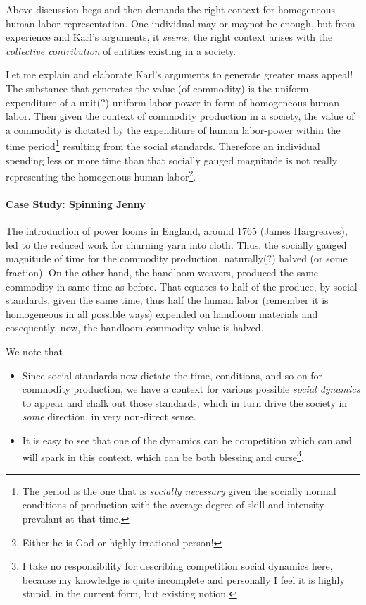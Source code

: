 \documentclass[12pt]{extarticle}
\theoremstyle{definition}
\newenvironment{remark}[1][Remark]{\begin{trivlist}
\item[\hskip \labelsep {\bfseries #1}]}{\end{trivlist}}
\begin{document}
        Above discussion begs and then demands the right context for homogeneous human labor representation.  One individual may or maynot be enough, but from experience and Karl's arguments, it \emph{seems}, the right context arises with the \emph{collective contribution} of entities existing in a society.

        Let me explain and elaborate Karl's arguments to generate greater mass appeal!  The substance that generates the value (of commodity) is the uniform expenditure of a unit(?) uniform labor-power in form of homogeneous human labor.  Then given the context of commodity production in a society, the value of a commodity is dictated by the expenditure of human labor-power within the time period\footnote{The period is the one that is \emph{socially necessary} given the socially normal conditions of production with the average degree of skill and intensity prevalant at that time.} resulting from the social standards.  Therefore an individual spending less or more time than that socially gauged magnitude is not really representing the homogenous human labor\footnote{Either he is God or highly irrational person!}.

        \paragraph{Case Study: Spinning Jenny}
        The introduction of power looms in England, around 1765 (\href{https://en.wikipedia.org/wiki/James_Hargreaves}{James Hargreaves}), led to the reduced work for churning yarn into cloth.  Thus, the socially gauged magnitude of time for the commodity production, naturally(?) halved (or some fraction).  On the other hand, the handloom weavers, produced the same commodity in same time as before.  That equates to half of the produce, by social standards, given the same time, thus half the human labor (remember it is homogeneous in all possible ways) expended on handloom materials and cosequently, now, the handloom commodity value is halved.

        \begin{remark}
          We note that
          \begin{itemize}
          \item Since social standards now dictate the time, conditions, and so on for commodity production, we have a context for various possible \emph{social dynamics} to appear and chalk out those standards, which in turn drive the society in \emph{some} direction, in very non-direct sense.
            \item It is easy to see that one of the dynamics can be competition which can and will spark in this context, which can be both blessing and curse\footnote{I take no responsibility for describing competition social dynamics here, because my knowledge is quite incomplete and personally I feel it is highly stupid, in the current form, but existing notion.}.
          \end{itemize}
        \end{remark}
\end{document}
